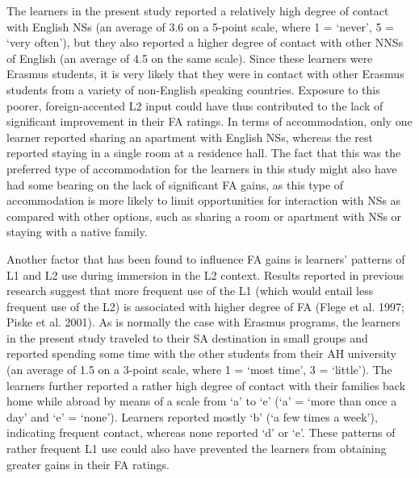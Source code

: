 \documentclass[12pt]{article}
\newenvironment{styleStandard}{\setlength\leftskip{0cm}\setlength\rightskip{0cm plus 1fil}\setlength\parindent{0cm}\setlength\parfillskip{0pt plus 1fil}\setlength\parskip{0in plus 1pt}\writerlistparindent\writerlistleftskip\leavevmode\normalfont\normalsize\writerlistlabel\ignorespaces}{\unskip\vspace{0.111in plus 0.0111in}\par}
\newcommand\writerlistleftskip{}
\newcommand\writerlistparindent{}
\newcommand\writerlistlabel{}
\begin{document}
\begin{styleStandard}
The learners in the present study reported a relatively high degree of contact with English NSs (an average of 3.6 on a 5-point scale, where 1 = ‘never’, 5 = ‘very often’), but they also reported a higher degree of contact with other NNSs of English (an average of 4.5 on the same scale). Since these learners were Erasmus students, it is very likely that they were in contact with other Erasmus students from a variety of non-English speaking countries. Exposure to this poorer, foreign-accented L2 input could have thus contributed to the lack of significant improvement in their FA ratings. In terms of accommodation, only one learner reported sharing an apartment with English NSs, whereas the rest reported staying in a single room at a residence hall. The fact that this was the preferred type of accommodation for the learners in this study might also have had some bearing on the lack of significant FA gains, as this type of accommodation is more likely to limit opportunities for interaction with NSs as compared with other options, such as sharing a room or apartment with NSs or staying with a native family.
\end{styleStandard}

\begin{styleStandard}
Another factor that has been found to influence FA gains is learners’ patterns of L1 and L2 use during immersion in the L2 context. Results reported in previous research suggest that more frequent use of the L1 (which would entail less frequent use of the L2) is associated with higher degree of FA (Flege et al. 1997; Piske et al. 2001). As is normally the case with Erasmus programs, the learners in the present study traveled to their SA destination in small groups and reported spending some time with the other students from their AH university (an average of 1.5 on a 3-point scale, where 1 = ‘most time’, 3 = ‘little’). The learners further reported a rather high degree of contact with their families back home while abroad by means of a scale from ‘a’ to ‘e’ (‘a’ = ‘more than once a day’ and ‘e’ = ‘none’). Learners reported mostly ‘b’ (‘a few times a week’), indicating frequent contact, whereas none reported ‘d’ or ‘e’. These patterns of rather frequent L1 use could also have prevented the learners from obtaining greater gains in their FA ratings.
\end{styleStandard}
\end{document}
